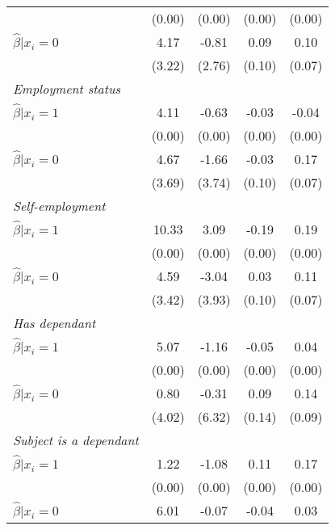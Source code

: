 \begin{table}[h]
{\begin{threeparttable}
\begin{tabular}{l*{4}{c}}
                &   (0.00)&   (0.00)&   (0.00)&   (0.00)\\
\hspace{0.5cm} \(\hat\beta|x_i=0\)&     4.17&    -0.81&     0.09&     0.10\\
                &   (3.22)&   (2.76)&   (0.10)&   (0.07)\\
\textit{Employment status}&         &         &         &         \\
\hspace{0.5cm} \(\hat\beta|x_i=1\)&     4.11&    -0.63&    -0.03&    -0.04\\
                &   (0.00)&   (0.00)&   (0.00)&   (0.00)\\
\hspace{0.5cm} \(\hat\beta|x_i=0\)&     4.67&    -1.66&    -0.03&0.17\sym{**}\\
                &   (3.69)&   (3.74)&   (0.10)&   (0.07)\\
\textit{Self-employment}&         &         &         &         \\
\hspace{0.5cm} \(\hat\beta|x_i=1\)&10.33\sym{*}&     3.09&    -0.19&     0.19\\
                &   (0.00)&   (0.00)&   (0.00)&   (0.00)\\
\hspace{0.5cm} \(\hat\beta|x_i=0\)&     4.59&    -3.04&     0.03&0.11\sym{*}\\
                &   (3.42)&   (3.93)&   (0.10)&   (0.07)\\
\textit{Has dependant}&         &         &         &         \\
\hspace{0.5cm} \(\hat\beta|x_i=1\)&5.07\sym{*}&    -1.16&    -0.05&     0.04\\
                &   (0.00)&   (0.00)&   (0.00)&   (0.00)\\
\hspace{0.5cm} \(\hat\beta|x_i=0\)&     0.80&    -0.31&     0.09&     0.14\\
                &   (4.02)&   (6.32)&   (0.14)&   (0.09)\\
\textit{Subject is a dependant}&         &         &         &         \\
\hspace{0.5cm} \(\hat\beta|x_i=1\)&     1.22&    -1.08&     0.11&0.17\sym{**}\\
                &   (0.00)&   (0.00)&   (0.00)&   (0.00)\\
\hspace{0.5cm} \(\hat\beta|x_i=0\)&6.01\sym{*}&    -0.07&    -0.04&     0.03\\

\end{tabular}
\end{threeparttable}}
\end{table}
